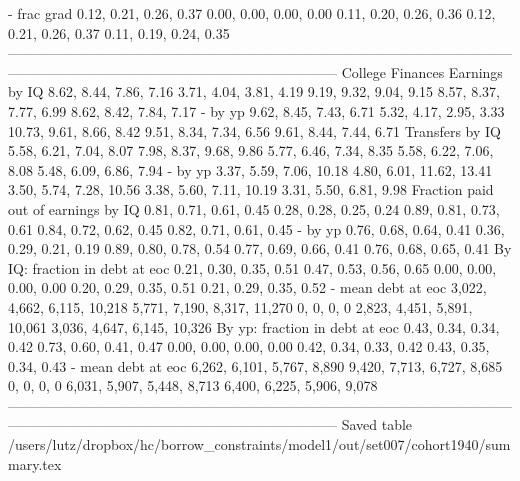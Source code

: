                            - frac grad       0.12, 0.21, 0.26, 0.37       0.00, 0.00, 0.00, 0.00   0.11, 0.20, 0.26, 0.36       0.12, 0.21, 0.26, 0.37       0.11, 0.19, 0.24, 0.35
-----------------------------------------------------------------------------------------------------------------------------------------------------------------------------------
                      College Finances                                                                                                                                             
                        Earnings by IQ       8.62, 8.44, 7.86, 7.16       3.71, 4.04, 3.81, 4.19   9.19, 9.32, 9.04, 9.15       8.57, 8.37, 7.77, 6.99       8.62, 8.42, 7.84, 7.17
                               - by yp       9.62, 8.45, 7.43, 6.71       5.32, 4.17, 2.95, 3.33  10.73, 9.61, 8.66, 8.42       9.51, 8.34, 7.34, 6.56       9.61, 8.44, 7.44, 6.71
                       Transfers by IQ       5.58, 6.21, 7.04, 8.07       7.98, 8.37, 9.68, 9.86   5.77, 6.46, 7.34, 8.35       5.58, 6.22, 7.06, 8.08       5.48, 6.09, 6.86, 7.94
                               - by yp      3.37, 5.59, 7.06, 10.18     4.80, 6.01, 11.62, 13.41  3.50, 5.74, 7.28, 10.56      3.38, 5.60, 7.11, 10.19       3.31, 5.50, 6.81, 9.98
   Fraction paid out of earnings by IQ       0.81, 0.71, 0.61, 0.45       0.28, 0.28, 0.25, 0.24   0.89, 0.81, 0.73, 0.61       0.84, 0.72, 0.62, 0.45       0.82, 0.71, 0.61, 0.45
                               - by yp       0.76, 0.68, 0.64, 0.41       0.36, 0.29, 0.21, 0.19   0.89, 0.80, 0.78, 0.54       0.77, 0.69, 0.66, 0.41       0.76, 0.68, 0.65, 0.41
        By IQ: fraction in debt at eoc       0.21, 0.30, 0.35, 0.51       0.47, 0.53, 0.56, 0.65   0.00, 0.00, 0.00, 0.00       0.20, 0.29, 0.35, 0.51       0.21, 0.29, 0.35, 0.52
                    - mean debt at eoc  3,022, 4,662, 6,115, 10,218  5,771, 7,190, 8,317, 11,270               0, 0, 0, 0  2,823, 4,451, 5,891, 10,061  3,036, 4,647, 6,145, 10,326
        By yp: fraction in debt at eoc       0.43, 0.34, 0.34, 0.42       0.73, 0.60, 0.41, 0.47   0.00, 0.00, 0.00, 0.00       0.42, 0.34, 0.33, 0.42       0.43, 0.35, 0.34, 0.43
                    - mean debt at eoc   6,262, 6,101, 5,767, 8,890   9,420, 7,713, 6,727, 8,685               0, 0, 0, 0   6,031, 5,907, 5,448, 8,713   6,400, 6,225, 5,906, 9,078
-----------------------------------------------------------------------------------------------------------------------------------------------------------------------------------
Saved table  /users/lutz/dropbox/hc/borrow_constraints/model1/out/set007/cohort1940/summary.tex 
